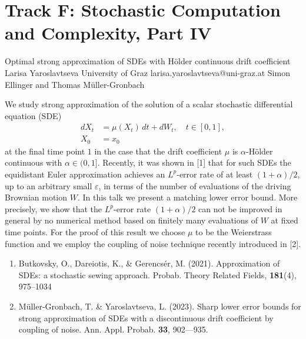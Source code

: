 \section{Track F: Stochastic Computation and Complexity, Part IV}\newpage

\begin{talk}
  {Optimal strong approximation of SDEs with H\"older continuous drift coefficient}%
  {Larisa Yaroslavtseva}%
  {University of Graz}%
  {larisa.yaroslavtseva@uni-graz.at}%
  {Simon Ellinger and Thomas M\"uller-Gronbach}%
  
    
   
We study strong approximation of the solution of a scalar stochastic differential equation (SDE)
\begin{equation}\label{sde0}
 \begin{aligned}
  dX_t & = \mu(X_t) \, dt +  dW_t, \quad t\in [0,1],\\
  X_0 & = x_0
 \end{aligned}
\end{equation}
at the final time point $1$
in the case that  the drift coefficient  $\mu$ is $\alpha$-H\"older continuous with $\alpha\in(0, 1]$.
Recently, it was  shown in [1] that for such SDEs the equidistant Euler approximation achieves an $L^p$-error rate of at least $(1+\alpha)/2$, up to an arbitrary small $\varepsilon$,
in terms of the number of evaluations of the driving Brownian motion $W$.
In this talk  we  
present a matching  lower error bound.   More precisely, we show that
the $L^p$-error rate $(1+\alpha)/2$ can
not be improved in general by  no numerical 
method based on finitely many evaluations of $W$ at fixed time points. For the proof of this result we choose  $\mu$ to be the Weierstrass function and we employ  the coupling of noise technique  recently introduced in [2].




\begin{enumerate}
 \item[{[1]}] Butkovsky, O., Dareiotis, K., \& Gerencs\'er, M. (2021). Approximation of SDEs: a stochastic sewing approach. Probab. Theory Related Fields, \textbf{181}(4), 975--1034
 \item[{[2]}] M\"uller-Gronbach, T.  \& Yaroslavtseva, L. (2023). Sharp lower error bounds for strong approximation of
 SDEs with a discontinuous drift coefficient by coupling of noise. Ann. Appl. Probab. \textbf{33}, 902---935.
\end{enumerate}


\end{talk}

